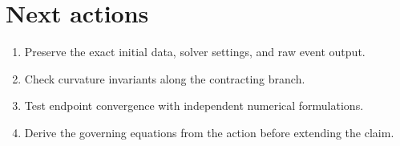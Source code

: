 \documentclass[11pt]{article}
\begin{document}
\section{Next actions}
\begin{enumerate}
  \item Preserve the exact initial data, solver settings, and raw event output.
  \item Check curvature invariants along the contracting branch.
  \item Test endpoint convergence with independent numerical formulations.
  \item Derive the governing equations from the action before extending the claim.
\end{enumerate}
\end{document}
